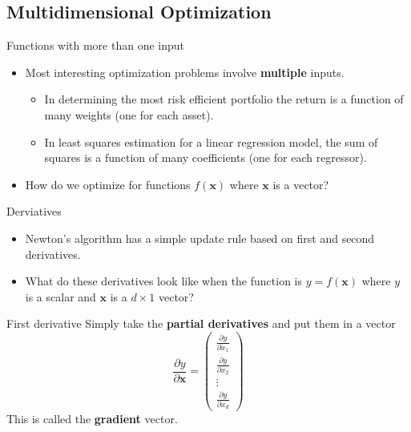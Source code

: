 \documentclass[10pt]{beamer}
\begin{document}
\subsection{Multidimensional Optimization}
\begin{frame}{Functions with more than one input}
  \begin{itemize}
  \item Most interesting optimization problems involve {\bf multiple} inputs.
    \begin{itemize}
    \item In determining the most risk efficient portfolio the return is a function of many weights (one for each asset).
    \item In least squares estimation for a linear regression model, the sum of squares is a function of many coefficients (one for each regressor).
    \end{itemize}
  \item How do we optimize for functions $f({\bm x})$ where ${\bm x}$ is a vector?
  \end{itemize}
\end{frame}
\begin{frame}{Derviatives}
  \begin{itemize}
  \item Newton's algorithm has a simple update rule based on first and second derivatives.

  \item What do these derivatives look like when the function is $y=f({\bm x})$ where $y$ is a scalar and ${\bm x}$ is a $d\times 1$ vector?
  \end{itemize}
\end{frame}
\begin{frame}{First derivative}
  Simply take the {\bf partial derivatives} and put them in a vector
  \begin{equation}
    \frac{\partial y}{\partial{\bm x}}=
    \left(
      \begin{array}{c}
        \frac{\partial y}{\partial x_1}\\
        \frac{\partial y}{\partial x_2}\\
        \vdots\\
        \frac{\partial y}{\partial x_d}
      \end{array}
    \right)
  \end{equation}
  This is called the {\bf gradient} vector.
\end{frame}
\end{document}
